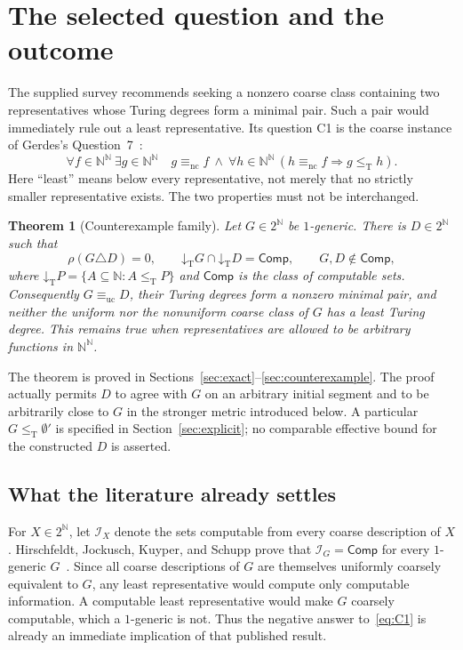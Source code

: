 \documentclass[11pt,a4paper]{article}
\newcommand{\N}{\mathbb N}
\newcommand{\Cantor}{2^{\N}}
\newcommand{\Baire}{\N^{\N}}
\newcommand{\leT}{\leq_{\mathrm T}}
\newcommand{\eqnc}{\equiv_{\mathrm{nc}}}
\newcommand{\equc}{\equiv_{\mathrm{uc}}}
\newcommand{\Comp}{\mathsf{Comp}}
\newcommand{\Core}{\mathcal I}
\newcommand{\low}[1]{\mathord{\downarrow}_{\mathrm T}#1}
\newtheorem{theorem}{Theorem}[section]
\theoremstyle{definition}\newtheorem{definition}[theorem]{Definition}
\theoremstyle{remark}\newtheorem{remark}[theorem]{Remark}
\begin{document}
\section{The selected question and the outcome}
\label{sec:outcome}
The supplied survey recommends seeking a nonzero coarse class containing two representatives whose Turing degrees form a minimal pair. Such a pair would immediately rule out a least representative. Its question C1 is the coarse instance of Gerdes's Question~7~\cite{Survey,Gerdes}:
\begin{equation}
\forall f\in\Baire\ \exists g\in\Baire\quad
 g\eqnc f\ \land\
 \forall h\in\Baire\,(h\eqnc f\Longrightarrow g\leT h).
\tag{C1}\label{eq:C1}
\end{equation}
Here ``least'' means below every representative, not merely that no strictly smaller representative exists. The two properties must not be interchanged.

\begin{theorem}[Counterexample family]\label{thm:main}
Let $G\in\Cantor$ be $1$-generic. There is $D\in\Cantor$ such that
\begin{equation}
 \rho(G\triangle D)=0,\qquad
 \low G\cap\low D=\Comp,\qquad
 G,D\notin\Comp,
 \label{eq:minpair}
\end{equation}
where $\low P=\{A\subseteq\N:A\leT P\}$ and $\Comp$ is the class of computable sets. Consequently $G\equc D$, their Turing degrees form a nonzero minimal pair, and neither the uniform nor the nonuniform coarse class of $G$ has a least Turing degree. This remains true when representatives are allowed to be arbitrary functions in $\Baire$.
\end{theorem}

The theorem is proved in Sections~\ref{sec:exact}--\ref{sec:counterexample}. The proof actually permits $D$ to agree with $G$ on an arbitrary initial segment and to be arbitrarily close to $G$ in the stronger metric introduced below. A particular $G\leT\emptyset'$ is specified in Section~\ref{sec:explicit}; no comparable effective bound for the constructed $D$ is asserted.

\subsection{What the literature already settles}
For $X\in\Cantor$, let $\Core_X$ denote the sets computable from every coarse description of $X$. Hirschfeldt, Jockusch, Kuyper, and Schupp prove that $\Core_G=\Comp$ for every $1$-generic $G$~\cite[Theorem~4.2]{HJKS}. Since all coarse descriptions of $G$ are themselves uniformly coarsely equivalent to $G$, any least representative would compute only computable information. A computable least representative would make $G$ coarsely computable, which a $1$-generic is not. Thus the negative answer to~\eqref{eq:C1} is already an immediate implication of that published result.
\end{document}
